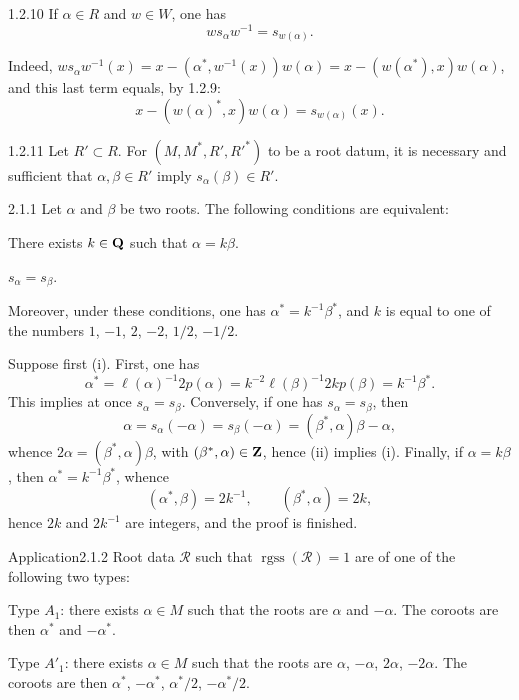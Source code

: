 \begin{corollary}{1.2.10}\label{XXI.1.2.10}
If $\alpha\in R$ and $w\in W$, one has
\[
ws_\alpha w^{-1}=s_{w(\alpha)}.
\]
\end{corollary}
Indeed, $ws_\alpha w^{-1}(x)=x-(\alpha^*,w^{-1}(x))w(\alpha)=x-(w(\alpha^*),x)w(\alpha)$, and this last term equals, by 1.2.9:
\[
x-(w(\alpha)^*,x)w(\alpha)=s_{w(\alpha)}(x).
\]
\begin{corollary}{1.2.11}\label{XXI.1.2.11}
Let $R'\subset R$. For $(M,M^*,R',R'^*)$ to be a root datum, it is necessary and sufficient that $\alpha,\beta\in R'$ imply $s_\alpha(\beta)\in R'$.
\end{corollary}

\label{XXI.sec.2}
\begin{proposition}{2.1.1}\label{XXI.2.1.1}
Let $\alpha$ and $\beta$ be two roots. The following conditions are equivalent:
\begin{enumeratei}
\item There exists $k\in\mathbf{Q}$ such that $\alpha=k\beta$.
\item $s_\alpha=s_\beta$.
\end{enumeratei}
Moreover, under these conditions, one has $\alpha^*=k^{-1}\beta^*$, and $k$ is equal to one of the numbers $1$, $-1$, $2$, $-2$, $1/2$, $-1/2$.
\end{proposition}
Suppose first (i). First, one has
\[
\alpha^*=\ell(\alpha)^{-1}2p(\alpha)=k^{-2}\ell(\beta)^{-1}2kp(\beta)=k^{-1}\beta^*.
\]
This implies at once $s_\alpha=s_\beta$. Conversely, if one has $s_\alpha=s_\beta$, then
\[
\alpha=s_\alpha(-\alpha)=s_\beta(-\alpha)=(\beta^*,\alpha)\beta-\alpha,
\]
whence $2\alpha=(\beta^*,\alpha)\beta$, with $(\beta^*,\alpha)\in\mathbf{Z}$, hence (ii) implies (i). Finally, if $\alpha=k\beta$, then $\alpha^*=k^{-1}\beta^*$, whence
\[
(\alpha^*,\beta)=2k^{-1},\qquad(\beta^*,\alpha)=2k,
\]
hence $2k$ and $2k^{-1}$ are integers, and the proof is finished.

\begin{enoncerm}{Application}{2.1.2}\label{XXI.2.1.2}
Root data $\mathcal R$ such that $\operatorname{rgss}(\mathcal R)=1$ are of one of the following two types:
\begin{enumeratei}
\item Type $A_1$: there exists $\alpha\in M$ such that the roots are $\alpha$ and $-\alpha$. The coroots are then $\alpha^*$ and $-\alpha^*$.
\item Type $A'_1$: there exists $\alpha\in M$ such that the roots are $\alpha$, $-\alpha$, $2\alpha$, $-2\alpha$. The coroots are then $\alpha^*$, $-\alpha^*$, $\alpha^*/2$, $-\alpha^*/2$.
\end{enumeratei}
\end{enoncerm}

